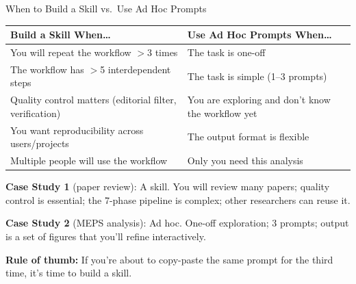 \documentclass[10pt,english,aspectratio=169]{beamer}
\begin{document}
\begin{frame}{When to Build a Skill vs.\ Use Ad Hoc Prompts}

\begin{small}
\begin{tabular}{p{6cm}p{6cm}}
\toprule
\textbf{Build a Skill When\ldots} & \textbf{Use Ad Hoc Prompts When\ldots} \\
\midrule
You will repeat the workflow $>$3 times & The task is one-off \\
The workflow has $>$5 interdependent steps & The task is simple (1--3 prompts) \\
Quality control matters (editorial filter, verification) & You are exploring and don't know the workflow yet \\
You want reproducibility across users/projects & The output format is flexible \\
Multiple people will use the workflow & Only you need this analysis \\
\bottomrule
\end{tabular}
\end{small}

\vspace{0.3cm}
\textbf{Case Study 1} (paper review): A skill. You will review many papers; quality control is essential; the 7-phase pipeline is complex; other researchers can reuse it.

\vspace{0.2cm}
\textbf{Case Study 2} (MEPS analysis): Ad hoc. One-off exploration; 3 prompts; output is a set of figures that you'll refine interactively.

\vspace{0.2cm}
\textbf{Rule of thumb:} If you're about to copy-paste the same prompt for the third time, it's time to build a skill.

\end{frame}
\end{document}
